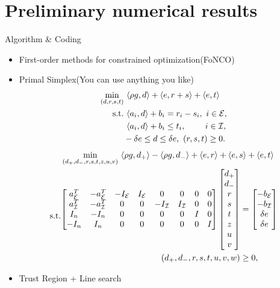\documentclass[8pt]{beamer}
\begin{document}
\section{Preliminary numerical results}
	
	\begin{frame}{Algorithm \& Coding}\begin{itemize}
		\vfill
			\item First-order methods for constrained optimization(FoNCO)
		\vfill
			\item Primal Simplex(You can use anything you like)
		\vfill
			\begin{equation}\label{sub.primal.lp}
			  \baligned
				\min_{(d, r, s, t)} &\   \langle \rho g, d\rangle + \langle e, r+s\rangle + \langle e, t\rangle \ \\
				 \st &\  \langle a_i, d\rangle + b_i = r_i-s_i, \ i\in\Ecal, \\   
					  &\  \langle a_i, d\rangle + b_i \le t_i, \qquad\  i\in\Ical, \\   
					  & -\delta e \le  d \le \delta e, \   (r,s,t) \ge 0.
			  \ealigned
			\end{equation}
		\vfill
			\begin{equation}\label{primal.standard}
			  \begin{aligned}
				& \min_{(d_+, d_-, r, s, t, z, u, v)} \   \langle \rho g,  d_+\rangle  - \langle \rho g,  d_-\rangle + \langle e, r\rangle + \langle e, s\rangle + \langle e, t\rangle \ \\
				 {\rm{s.t.}} & \begin{aligned}
				 \begin{bmatrix}
				 a_{{\cal E}}^T & -a_{{\cal E}}^T  &  - I_{{\cal E}} & I_{{\cal E}} & 0 & 0  & 0 & 0 \\
				 a_{{\cal I}}^T  & -a_{{\cal I}}^T   &  0 & 0 & -I_{{\cal I}} & I_{{\cal I}} & 0 & 0 \\
				 I_n & - I_n & 0 & 0 & 0 & 0 & I  & 0  \\
				 -I_n& I_n & 0 & 0 & 0 & 0  &  0 & I 
				 \end{bmatrix}   
				 \begin{bmatrix} d_+ \\ d_- \\ r \\ s \\ t \\ z \\ u \\ v    \end{bmatrix} 
				 &= \begin{bmatrix} -b_{{\cal E}} \\ -b_{{\cal I}} \\  \delta e \\  \delta e  \end{bmatrix} \\  
					( d_+, d_-, r, s, t, u, v, w)  & \ge 0,
					  \end{aligned}
			  \end{aligned}
			\end{equation}
		\vfill 
			\item Trust Region + Line search
	\end{itemize}\end{frame}
\end{document}
